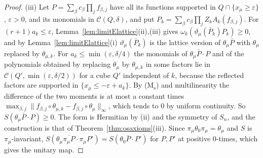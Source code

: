 \documentclass[aps,prd,twocolumn,superscriptaddress,nofootinbib,longbibliography,floatfix,amsmath,amssymb,10pt]{revtex4-2}
\theoremstyle{definition}
\theoremstyle{remark}
\begin{document}
\begin{proof}
(iii) Let $P=\sum_\beta c_\beta\prod_jf_{\beta,j}$ have all its functions
supported in $Q\cap\{x_\mu\ge\varepsilon\}$, $\varepsilon>0$, and its
monomials in $\mathcal C(Q,\delta)$, and put $P_k=\sum_\beta c_\beta\prod_j
Z_kA_k(f_{\beta,j})$. For $(r+1)a_k\le\varepsilon$,
Lemma~\ref{lem:limitElattice}(ii),(iii) gives $\omega_k(\vartheta_\mu(\bar
P_k)P_k)\ge0$, and by Lemma~\ref{lem:limitElattice}(i)
$\vartheta_\mu(\bar P_k)$ is the lattice version of $\theta_\mu\bar P$ with
$\theta_\mu$ replaced by $\theta_{\mu,k}$. For $a_k\le\min(\varepsilon,
\delta/4)$ the monomials of $\theta_\mu\bar P\cdot P$ and of the polynomials
obtained by replacing $\theta_\mu$ by $\theta_{\mu,k}$ in some factors lie
in $\mathcal C(Q',\min(\varepsilon,\delta/2))$ for a cube $Q'$ independent of
$k$, because the reflected factors are supported in $\{x_\mu\le-\varepsilon
+a_k\}$. By (M$_{\mathrm s}$) and multilinearity the difference of the two moments is at
most a constant times $\max_{\beta,j}\|f_{\beta,j}\circ\theta_{\mu,k}-
f_{\beta,j}\circ\theta_\mu\|_\infty$, which tends to $0$ by uniform
continuity. So $S(\theta_\mu\bar P\cdot P)\ge0$. The form is Hermitian by
(ii) and the symmetry of $S_n$, and the construction is that of
Theorem~\ref{thm:osaxioms}(iii). Since $\pi_\mu\theta_0\pi_\mu=\theta_\mu$
and $S$ is $\pi_\mu$-invariant, $S(\theta_\mu\overline{\pi_\mu P}\cdot\pi_\mu
P')=S(\theta_0\bar P\cdot P')$ for $P,P'$ at positive $0$-times, which
gives the unitary map.


\end{proof}
\end{document}
